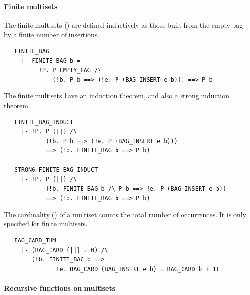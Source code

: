 \paragraph {Finite multisets}

The finite multisets () are defined inductively as
those built from the empty bag by a finite number of insertions.
%
\begin{hol}
\begin{verbatim}
   FINITE_BAG
     |- FINITE_BAG b =
          !P. P EMPTY_BAG /\
              (!b. P b ==> (!e. P (BAG_INSERT e b))) ==> P b
\end{verbatim}
\end{hol}
%
The finite multisets have an induction theorem, and also a strong
induction theorem.
%
%
\begin{hol}
\begin{verbatim}
   FINITE_BAG_INDUCT
     |- !P. P {||} /\
            (!b. P b ==> (!e. P (BAG_INSERT e b)))
            ==> (!b. FINITE_BAG b ==> P b)

   STRONG_FINITE_BAG_INDUCT
     |- !P. P {||} /\
            (!b. FINITE_BAG b /\ P b ==> !e. P (BAG_INSERT e b))
            ==> (!b. FINITE_BAG b ==> P b)
\end{verbatim}
\end{hol}
%
The cardinality () of a multiset counts the
total number of occurrences. It is only specified for finite multisets.
%
\begin{hol}
\begin{verbatim}
   BAG_CARD_THM
     |- (BAG_CARD {||} = 0) /\
        (!b. FINITE_BAG b ==>
               !e. BAG_CARD (BAG_INSERT e b) = BAG_CARD b + 1)
\end{verbatim}
\end{hol}

\paragraph{Recursive functions on multisets}

